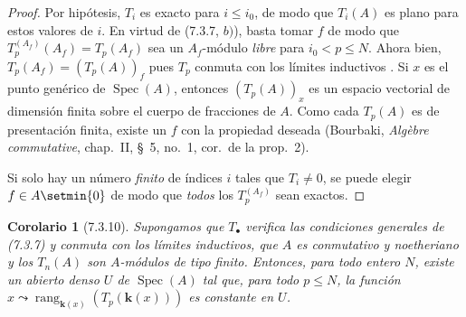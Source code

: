 \documentclass[10pt,oneside,openany]{book}
\theoremstyle{egaenv}\newtheorem*{env}{---}
\theoremstyle{egastatement}
\newtheorem*{corollary}{Corolario}
\theoremstyle{egadescription}
\renewcommand{\leq}{\leqslant}
\begin{document}
\begin{proof}
Por hipótesis, $T_i$ es exacto para $i\leq i_0$, de modo que
$T_i(A)$ es plano para estos valores de $i$. En virtud de (7.3.7, $b)$), basta tomar $f$ de modo que
$T_p^{(A_f)}(A_f)=T_p(A_f)$
sea un $A_f$-módulo \emph{libre} para $i_0<p\leq N$. Ahora bien,
$T_p(A_f)=(T_p(A))_f$
pues $T_p$ conmuta con los límites inductivos . Si
$x$ es el punto genérico de $\operatorname{Spec}(A)$, entonces
$(T_p(A))_x$ es un espacio vectorial de dimensión finita
sobre el cuerpo de fracciones de $A$. Como cada $T_p(A)$ es de
presentación finita, existe un $f$ con la propiedad deseada
(Bourbaki, \emph{Alg\`ebre commutative}, chap.~II, \S~5,
no.~1, cor.\ de la prop.~2).

Si solo hay un número \emph{finito} de índices $i$ tales que $T_i\ne0$,
se puede elegir $f\in A\setmin\{0\}$ de modo que \emph{todos} los
$T_p^{(A_f)}$ sean exactos.
\end{proof}

\begin{corollary}[7.3.10]
Supongamos que $T_\bullet$ verifica las condiciones generales de \textup{(7.3.7)} y
conmuta con los límites inductivos, que $A$ es conmutativo y noetheriano y los
$T_n(A)$ son $A$-módulos de tipo finito. Entonces, para todo entero $N$, existe
un abierto denso $U$ de $\operatorname{Spec}(A)$ tal que, para todo $p\leq N$,
la función
$x\leadsto\operatorname{rang}_{\mathbf{k}(x)}(T_p(\boldsymbol{k}(x)))$
es constante en $U$.
\end{corollary}
\end{document}
